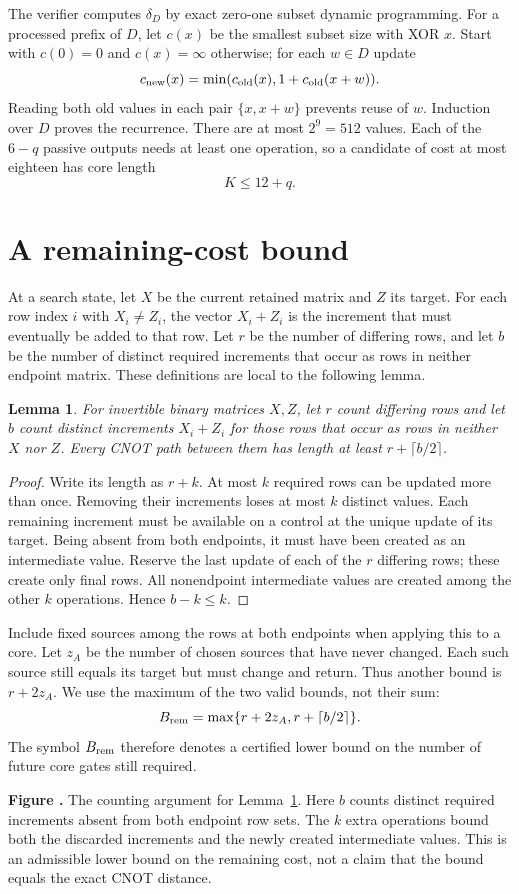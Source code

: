\documentclass[11pt]{article}
\newtheorem{lemma}[theorem]{Lemma}
\newcommand{\prooffigure}[3]{%
  \begin{center}
  \begin{minipage}{.98\linewidth}
  \centering
  \resizebox{\linewidth}{!}{}\par
  \refstepcounter{figure}\label{#2}%
  \small\textbf{Figure \thefigure.} #3
  \end{minipage}
  \end{center}}
\begin{document}
The verifier computes $\delta_D$ by exact zero-one subset dynamic
programming. For a processed prefix of $D$, let $c(x)$ be the smallest
subset size with XOR $x$. Start with $c(0)=0$ and $c(x)=\infty$ otherwise;
for each $w\in D$ update
\[
c_{\rm new}(x)=\min(c_{\rm old}(x),1+c_{\rm old}(x+w)).
\]
Reading both old values in each pair $\{x,x+w\}$ prevents reuse of $w$.
Induction over $D$ proves the recurrence. There are at most $2^9=512$
values. Each of the $6-q$ passive outputs needs at least one operation,
so a candidate of cost at most eighteen has core length
\begin{equation}\label{eq:cap}K\le12+q.\end{equation}

\section{A remaining-cost bound}
At a search state, let $X$ be the current retained matrix and $Z$ its target.
For each row index $i$ with $X_i\ne Z_i$, the vector $X_i+Z_i$ is the
increment that must eventually be added to that row. Let $r$ be the number
of differing rows, and let $b$ be the number of distinct required increments
that occur as rows in neither endpoint matrix. These definitions are local
to the following lemma.
\begin{lemma}\label{lem:remaining}
For invertible binary matrices $X,Z$, let $r$ count differing rows and
let $b$ count distinct increments $X_i+Z_i$ for those rows that occur
as rows in neither $X$ nor $Z$. Every CNOT path between them has length
at least $r+\lceil b/2\rceil$.
\end{lemma}
\begin{proof}
Write its length as $r+k$. At most $k$ required rows can be updated
more than once. Removing their increments loses at most $k$ distinct
values. Each remaining increment must be available on a control at
the unique update of its target. Being absent from both endpoints,
it must have been created as an intermediate value. Reserve the last
update of each of the $r$ differing rows; these create only final rows.
All nonendpoint intermediate values are created among the other $k$
operations. Hence $b-k\le k$.
\end{proof}
Include fixed sources among the rows at both endpoints when applying
this to a core. Let $z_A$ be the number of chosen sources that have never
changed. Each such source still
equals its target but must change and return. Thus another bound is
$r+2z_A$. We use the maximum of the two valid bounds, not their sum:
\[B_{\rm rem}=\max\{r+2z_A,r+\lceil b/2\rceil\}.\]
The symbol $B_{\rm rem}$ therefore denotes a certified lower bound on the
number of future core gates still required.
\prooffigure{remaining_bound}{fig:remaining}{The counting argument for
Lemma~\ref{lem:remaining}. Here $b$ counts distinct required increments
absent from both endpoint row sets. The $k$ extra operations bound both
the discarded increments and the newly created intermediate values. This is
an admissible lower bound on the remaining cost, not a claim that the bound
equals the exact CNOT distance.}
\end{document}
